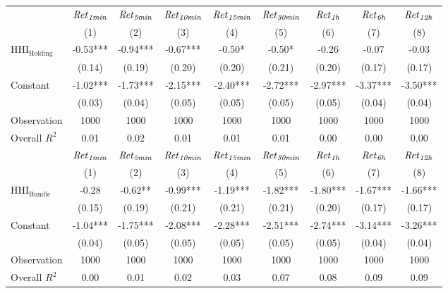 \begin{tabular}{lcccccccc}
\hline
 & ${\it Ret}_{\it 1min}$ & ${\it Ret}_{\it 5min}$ & ${\it Ret}_{\it 10min}$ & ${\it Ret}_{\it 15min}$ & ${\it Ret}_{\it 30min}$ & ${\it Ret}_{\it 1h}$ & ${\it Ret}_{\it 6h}$ & ${\it Ret}_{\it 12h}$ \\
 & (1) & (2) & (3) & (4) & (5) & (6) & (7) & (8) \\
\hline
$\mathrm{HHI_\mathrm{Holding}}$ & -0.53*** & -0.94*** & -0.67*** & -0.50* & -0.50* & -0.26 & -0.07 & -0.03 \\
 & (0.14) & (0.19) & (0.20) & (0.20) & (0.21) & (0.20) & (0.17) & (0.17) \\
Constant & -1.02*** & -1.73*** & -2.15*** & -2.40*** & -2.72*** & -2.97*** & -3.37*** & -3.50*** \\
 & (0.03) & (0.04) & (0.05) & (0.05) & (0.05) & (0.05) & (0.04) & (0.04) \\
Observation & 1000 & 1000 & 1000 & 1000 & 1000 & 1000 & 1000 & 1000 \\
Overall $R^2$ & 0.01 & 0.02 & 0.01 & 0.01 & 0.01 & 0.00 & 0.00 & 0.00 \\
\hline
 & ${\it Ret}_{\it 1min}$ & ${\it Ret}_{\it 5min}$ & ${\it Ret}_{\it 10min}$ & ${\it Ret}_{\it 15min}$ & ${\it Ret}_{\it 30min}$ & ${\it Ret}_{\it 1h}$ & ${\it Ret}_{\it 6h}$ & ${\it Ret}_{\it 12h}$ \\
 & (1) & (2) & (3) & (4) & (5) & (6) & (7) & (8) \\
\hline
$\mathrm{HHI_\mathrm{Bundle}}$ & -0.28 & -0.62** & -0.99*** & -1.19*** & -1.82*** & -1.80*** & -1.67*** & -1.66*** \\
 & (0.15) & (0.19) & (0.21) & (0.21) & (0.21) & (0.20) & (0.17) & (0.17) \\
Constant & -1.04*** & -1.75*** & -2.08*** & -2.28*** & -2.51*** & -2.74*** & -3.14*** & -3.26*** \\
 & (0.04) & (0.05) & (0.05) & (0.05) & (0.05) & (0.05) & (0.04) & (0.04) \\
Observation & 1000 & 1000 & 1000 & 1000 & 1000 & 1000 & 1000 & 1000 \\
Overall $R^2$ & 0.00 & 0.01 & 0.02 & 0.03 & 0.07 & 0.08 & 0.09 & 0.09 \\
\hline
\end{tabular}
